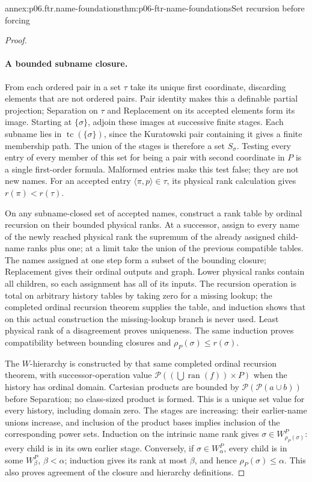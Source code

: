 \begin{annexitem}{annex:p06.ftr.name-foundations}{thm:p06-ftr-name-foundations}{Set recursion before forcing}
\begin{proof}
\paragraph{A bounded subname closure.}
From each ordered pair in a set \(\tau\) take its unique first coordinate,
discarding elements that are not ordered pairs. Pair identity makes this
a definable partial projection; Separation on \(\tau\) and Replacement
on its accepted elements form its image. Starting at \(\{\sigma\}\),
adjoin these images at successive finite stages. Each subname lies in
\(\operatorname{tc}(\{\sigma\})\), since the Kuratowski pair containing
it gives a finite membership path. The union of the stages is therefore
a set \(S_\sigma\). Testing every entry of every member of this set
for being a pair with second coordinate in \(P\) is a single first-order
formula. Malformed entries make this test false; they are not new names.
For an accepted entry \(\langle\pi,p\rangle\in\tau\), its physical
rank calculation gives \(r(\pi)<r(\tau)\).

On any subname-closed set of accepted names, construct a rank table by
ordinal recursion on their bounded physical ranks. At a successor, assign
to every name of the newly reached physical rank the supremum of the
already assigned child-name ranks plus one; at a limit take the union of
the previous compatible tables. The names assigned at one step form a
subset of the bounding closure; Replacement gives their ordinal outputs
and graph. Lower physical ranks contain all children, so each assignment
has all of its inputs. The recursion operation is total on arbitrary
history tables by taking zero for a missing lookup; the completed ordinal
recursion theorem supplies the table, and induction shows that on this
actual construction the missing-lookup branch is never used.
Least physical rank of a disagreement proves uniqueness. The same
induction proves compatibility between bounding closures and
\(\rho_P(\sigma)\leq r(\sigma)\).

The \(W\)-hierarchy is constructed by that same completed ordinal
recursion theorem, with successor-operation value
\(\mathcal P((\bigcup\operatorname{ran}(f))\times P)\) when the
history has ordinal domain. Cartesian products are bounded by
\(\mathcal P(\mathcal P(a\cup b))\) before Separation; no class-sized
product is formed. This is a unique set value for every history, including
domain zero. The stages are increasing: their earlier-name unions increase,
and inclusion of the product bases implies inclusion of the corresponding
power sets. Induction on the intrinsic name rank gives
\(\sigma\in W_{\rho_P(\sigma)}^P\): every child is in its own earlier
stage. Conversely, if \(\sigma\in W_\alpha^P\), every child is in
some \(W_\beta^P\), \(\beta<\alpha\); induction gives its rank at
most \(\beta\), and hence \(\rho_P(\sigma)\leq\alpha\).
This also proves agreement of the closure and hierarchy definitions.


\end{proof}
\end{annexitem}
